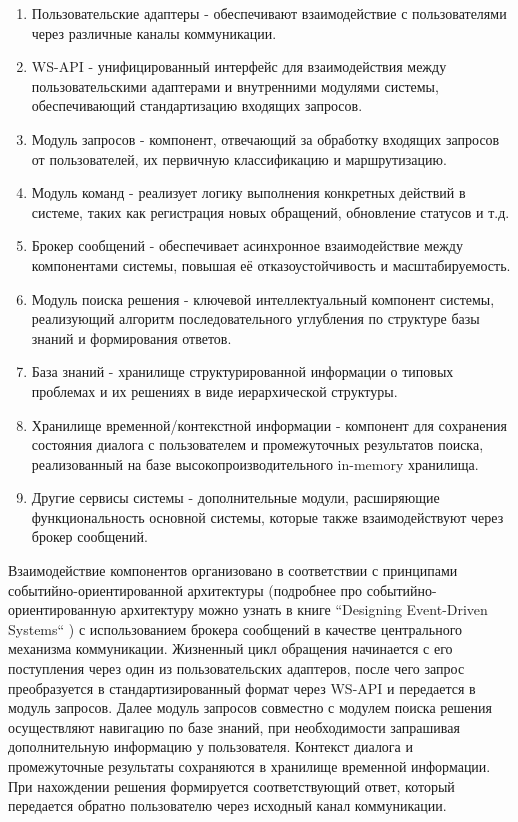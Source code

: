 \begin{enumerate}[label=\arabic*]
    \item Пользовательские адаптеры - обеспечивают взаимодействие с пользователями через различные каналы коммуникации.
    \item WS-API - унифицированный интерфейс для взаимодействия между пользовательскими адаптерами и внутренними модулями системы, обеспечивающий стандартизацию входящих запросов.
    \item Модуль запросов - компонент, отвечающий за обработку входящих запросов от пользователей, их первичную классификацию и маршрутизацию.
    \item Модуль команд - реализует логику выполнения конкретных действий в системе, таких как регистрация новых обращений, обновление статусов и т.д.
    \item Брокер сообщений - обеспечивает асинхронное взаимодействие между компонентами системы, повышая её отказоустойчивость и масштабируемость.
    \item Модуль поиска решения - ключевой интеллектуальный компонент системы, реализующий алгоритм последовательного углубления по структуре базы знаний и формирования ответов.
    \item База знаний - хранилище структурированной информации о типовых проблемах и их решениях в виде иерархической структуры.
    \item Хранилище временной/контекстной информации - компонент для сохранения состояния диалога с пользователем и промежуточных результатов поиска, реализованный на базе высокопроизводительного in-memory хранилища.
    \item Другие сервисы системы - дополнительные модули, расширяющие функциональность основной системы, которые также взаимодействуют через брокер сообщений.
\end{enumerate}

Взаимодействие компонентов организовано в соответствии с принципами событийно-ориентированной архитектуры (подробнее про событийно-ориентированную архитектуру можно узнать в книге ``Designing Event-Driven Systems`` \cite{stopford2018designing}) с использованием брокера сообщений в качестве центрального механизма коммуникации. Жизненный цикл обращения начинается с его поступления через один из пользовательских адаптеров, после чего запрос преобразуется в стандартизированный формат через WS-API и передается в модуль запросов. Далее модуль запросов совместно с модулем поиска решения осуществляют навигацию по базе знаний, при необходимости запрашивая дополнительную информацию у пользователя. Контекст диалога и промежуточные результаты сохраняются в хранилище временной информации. При нахождении решения формируется соответствующий ответ, который передается обратно пользователю через исходный канал коммуникации.

